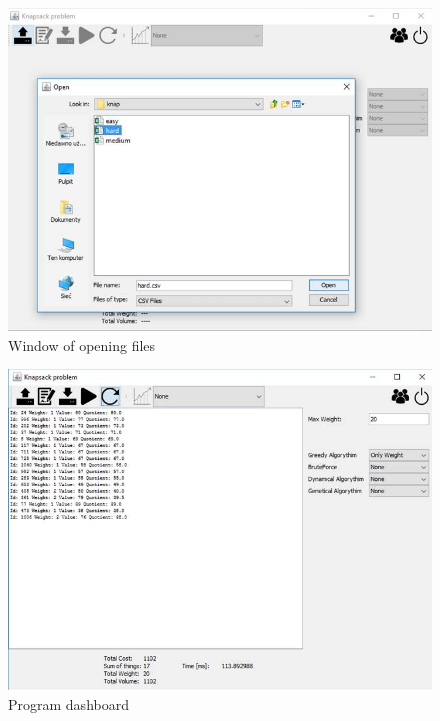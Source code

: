 \documentclass[conference,compsoc]{IEEEtran}
\begin{document}
\begin{figure}[H]
  \centering
  \includegraphics[width=\columnwidth]{image004p.jpg}
  \caption{Window of opening files}
\end{figure}



\begin{figure}[H]
  \centering
  \includegraphics[width=\columnwidth]{image006p.jpg}
  \caption{Program dashboard }
\end{figure}
\end{document}
